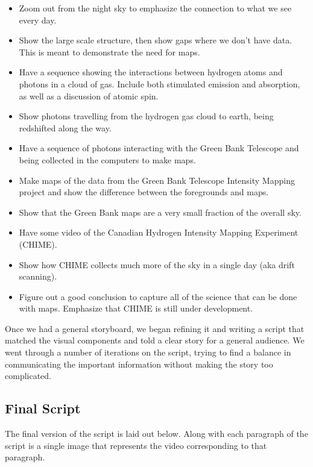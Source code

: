 \begin{itemize}
\item Zoom out from the night sky to emphasize the connection to what we see every day.
\item Show the large scale structure, then show gaps where we don't have data. This is meant to demonstrate the need for \cm maps.
\item Have a sequence showing the interactions between hydrogen atoms and \cm photons in a cloud of gas. Include both stimulated emission and absorption, as well as a discussion of atomic spin.
\item Show photons travelling from the hydrogen gas cloud to earth, being redshifted along the way. 
\item Have a sequence of photons interacting with the Green Bank Telescope and being collected in the computers to make maps.
\item Make maps of the data from the Green Bank Telescope Intensity Mapping project and show the difference between the foregrounds and \cm maps. 
\item Show that the Green Bank maps are a very small fraction of the overall sky.
\item Have some video of the Canadian Hydrogen Intensity Mapping Experiment (CHIME).
\item Show how CHIME collects much more of the sky in a single day (aka drift scanning). 
\item Figure out a good conclusion to capture all of the science that can be done with \cm maps. Emphasize that CHIME is still under development. 
\end{itemize}

Once we had a general storyboard, we began refining it and writing a script that matched the visual components and told a clear story for a general audience. We went through a number of iterations on the script, trying to find a balance in communicating the important information without making the story too complicated. 

\subsection{Final Script}
The final version of the script is laid out below. Along with each paragraph of the script is a single image that represents the video corresponding to that paragraph. 

